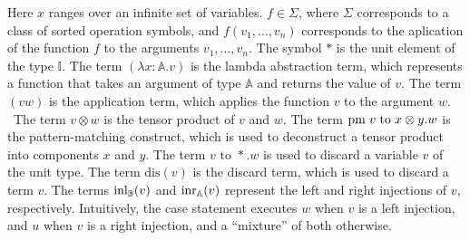 Here $x$ ranges over an infinite set of variables. $f \in \Sigma$, where  $\Sigma$ corresponds to a class of sorted operation symbols, and $f(v_1, \ldots, v_n)$ corresponds to the aplication of the function $f$ to the arguments $v_1, \ldots, v_n$. The symbol $*$ is the unit element of the type $\mathbb{I}$. The term $(\lambda x: \mathbb{A}. v )$ is the lambda abstraction term, which represents a function that takes an argument of type $\mathbb{A}$ and returns the value of $v$. The term $(v w)$ is the application term, which applies the function $v$ to the argument $w$.  The term $v \otimes w$ is the tensor product of $v$ and $w$. The term $\text{pm} \hspace{3 pt} v \hspace{3 pt} \text{to} \hspace{3 pt} x \otimes y. w$ is the pattern-matching construct, which is used to deconstruct a tensor product into components $x$ and $y$. The term $v \text{ to } *.w$ is used to discard a variable $v$ of the unit type. The term $\text{dis}(v)$ is the discard term, which is used to discard a term $v$. The terms $\text{inl}_{\mathbb{B}}(v)$ and $\text{inr}_{\mathbb{A}}(v)$ represent the left and right injections of $v$, respectively. Intuitively, the case statement executes $w$ when $v$ is a left injection, and $u$ when $v$ is a right injection, and a ``mixture'' of both otherwise.








